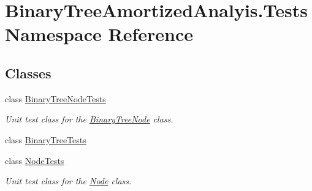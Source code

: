 \hypertarget{namespace_binary_tree_amortized_analyis_1_1_tests}{}\section{Binary\+Tree\+Amortized\+Analyis.\+Tests Namespace Reference}
\label{namespace_binary_tree_amortized_analyis_1_1_tests}
\subsection*{Classes}
\begin{DoxyCompactItemize}
\item 
class \hyperlink{class_binary_tree_amortized_analyis_1_1_tests_1_1_binary_tree_node_tests}{Binary\+Tree\+Node\+Tests}
\begin{DoxyCompactList}\small\item\em Unit test class for the \hyperlink{class_binary_tree_amortized_analyis_1_1_binary_tree_node}{Binary\+Tree\+Node} class. \end{DoxyCompactList}\item 
class \hyperlink{class_binary_tree_amortized_analyis_1_1_tests_1_1_binary_tree_tests}{Binary\+Tree\+Tests}
\item 
class \hyperlink{class_binary_tree_amortized_analyis_1_1_tests_1_1_node_tests}{Node\+Tests}
\begin{DoxyCompactList}\small\item\em Unit test class for the \hyperlink{class_binary_tree_amortized_analyis_1_1_node}{Node} class. \end{DoxyCompactList}\end{DoxyCompactItemize}
